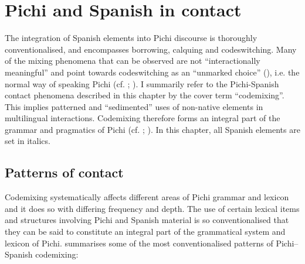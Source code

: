 \chapter{Pichi and Spanish in contact}

The integration of Spanish elements into Pichi discourse is thoroughly conventionalised, and encompasses borrowing, calquing and codeswitching. Many of the mixing phenomena that can be observed are not “interactionally meaningful” \citep[20]{Auer1998} and point towards codeswitching as an “unmarked choice” (\citealt{Scotton1993}), i.e. the normal way of speaking Pichi (cf. \citealt{Yakpo2015}; \citealt{Yakpo2017b}). I summarily refer to the Pichi-Spanish contact phenomena described in this chapter by the cover term “codemixing”\citep{Muysken2000}. This implies patterned and “sedimented” \citep{Auer1999} uses of non-native elements in multilingual interactions. Codemixing therefore forms an integral part of the grammar and pragmatics of Pichi (cf. \citealt{Yakpo2009b}; \citealt{Yakpo2018}). In this chapter, all Spanish elements are set in italics. 

\section{Patterns of contact}\label{sec:13.1}

Codemixing systematically affects different areas of Pichi grammar and lexicon and it does so with differing frequency and depth. The use of certain lexical items and structures involving Pichi and Spanish material is so conventionalised that they can be said to constitute an integral part of the grammatical system and lexicon of Pichi.  summarises some of the most conventionalised patterns of Pichi–Spanish codemixing: 

